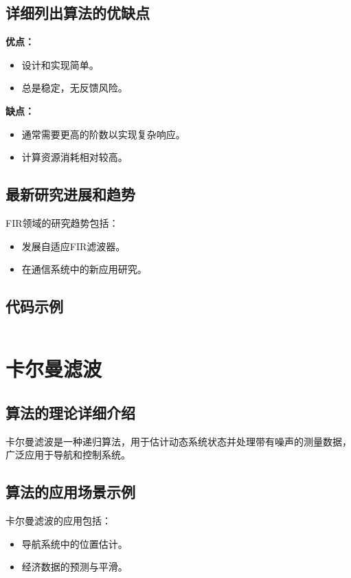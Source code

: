 \subsection*{详细列出算法的优缺点}
\textbf{优点：}
\begin{itemize}
    \item 设计和实现简单。
    \item 总是稳定，无反馈风险。
\end{itemize}

\textbf{缺点：}
\begin{itemize}
    \item 通常需要更高的阶数以实现复杂响应。
    \item 计算资源消耗相对较高。
\end{itemize}

\subsection*{最新研究进展和趋势}
FIR领域的研究趋势包括：
\begin{itemize}
    \item 发展自适应FIR滤波器。
    \item 在通信系统中的新应用研究。
\end{itemize}
\subsection*{代码示例}
\begin{lstlisting}

\end{lstlisting}


\section{卡尔曼滤波}
\subsection*{算法的理论详细介绍}
卡尔曼滤波是一种递归算法，用于估计动态系统状态并处理带有噪声的测量数据，广泛应用于导航和控制系统。

\subsection*{算法的应用场景示例}
卡尔曼滤波的应用包括：
\begin{itemize}
    \item 导航系统中的位置估计。
    \item 经济数据的预测与平滑。
\end{itemize}

